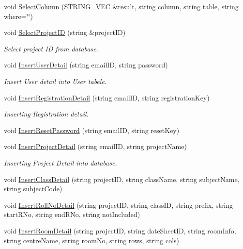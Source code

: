 \begin{DoxyCompactItemize}
\item 
void \hyperlink{classDatabase_a52049c686ad213533bdb1c4f2ac3c157}{Select\-Column} (S\-T\-R\-I\-N\-G\-\_\-\-V\-E\-C \&result, string column, string table, string where=\char`\"{}\char`\"{})
\item 
void \hyperlink{classDatabase_a20f7ccadac8f3b67d4344f7da4594eda}{Select\-Project\-I\-D} (string \&project\-I\-D)
\begin{DoxyCompactList}\small\item\em Select project I\-D from database. \end{DoxyCompactList}\item 
void \hyperlink{classDatabase_ac2a20fd57ba7a51f819446e799d7100f}{Insert\-User\-Detail} (string email\-I\-D, string password)
\begin{DoxyCompactList}\small\item\em Insert User detail into User tabele. \end{DoxyCompactList}\item 
void \hyperlink{classDatabase_a0da52e0b3d6e36d0833da38a01e592ea}{Insert\-Registration\-Detail} (string email\-I\-D, string registration\-Key)
\begin{DoxyCompactList}\small\item\em Inserting Registration detail. \end{DoxyCompactList}\item 
void \hyperlink{classDatabase_a1ff67f74b3c9c7893880cfefda1dc692}{Insert\-Reset\-Password} (string email\-I\-D, string reset\-Key)
\item 
void \hyperlink{classDatabase_a12b1d8ae6998720ad1842382ef5aa6cc}{Insert\-Project\-Detail} (string email\-I\-D, string project\-Name)
\begin{DoxyCompactList}\small\item\em Inserting Project Detail into database. \end{DoxyCompactList}\item 
void \hyperlink{classDatabase_ad0052cd5a48f5ba3233395096ba6e422}{Insert\-Class\-Detail} (string project\-I\-D, string class\-Name, string subject\-Name, string subject\-Code)
\item 
void \hyperlink{classDatabase_a91882082bd5309ba21d7250f0877ab39}{Insert\-Roll\-No\-Detail} (string project\-I\-D, string class\-I\-D, string prefix, string start\-R\-No, string end\-R\-No, string not\-Included)
\item 
void \hyperlink{classDatabase_a27092ca18e5f95b2808e54ad89c6ca35}{Insert\-Room\-Detail} (string project\-I\-D, string date\-Sheet\-I\-D, string room\-Info, string centre\-Name, string room\-No, string rows, string cols)

\end{DoxyCompactItemize}
